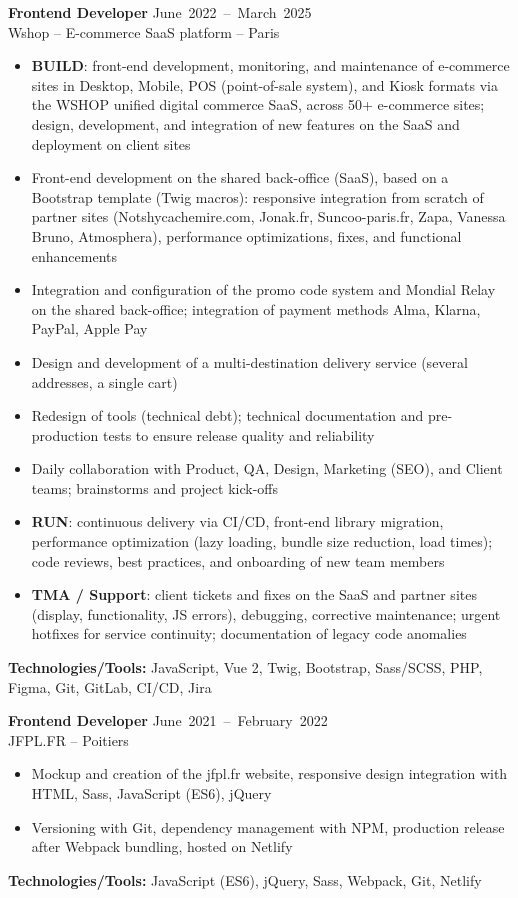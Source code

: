 \documentclass[9pt,a4paper]{extarticle}
\newcommand{\entry}[3]{%
  \vspace{0.25em}%
  {\bfseries #1} \hfill {\color{grey}\footnotesize\mbox{#2}}\\[-1pt]
  {\color{accent}\footnotesize #3}\par\vspace{0.1em}%
}
\begin{document}
{\begin{minipage}[t]{0.488\textwidth}
\entry{Frontend Developer}{June 2022 -- March 2025}{Wshop -- E-commerce SaaS platform -- Paris}
\begin{itemize}
  \item \textbf{BUILD}: front-end development, monitoring, and maintenance of e-commerce sites in Desktop, Mobile, POS (point-of-sale system), and Kiosk formats via the WSHOP unified digital commerce SaaS, across 50+ e-commerce sites; design, development, and integration of new features on the SaaS and deployment on client sites
  \item Front-end development on the shared back-office (SaaS), based on a Bootstrap template (Twig macros): responsive integration from scratch of partner sites (Notshycachemire.com, Jonak.fr, Suncoo-paris.fr, Zapa, Vanessa Bruno, Atmosphera), performance optimizations, fixes, and functional enhancements
  \item Integration and configuration of the promo code system and Mondial Relay on the shared back-office; integration of payment methods Alma, Klarna, PayPal, Apple Pay
  \item Design and development of a multi-destination delivery service (several addresses, a single cart)
  \item Redesign of tools (technical debt); technical documentation and pre-production tests to ensure release quality and reliability
  \item Daily collaboration with Product, QA, Design, Marketing (SEO), and Client teams; brainstorms and project kick-offs
  \item \textbf{RUN}: continuous delivery via CI/CD, front-end library migration, performance optimization (lazy loading, bundle size reduction, load times); code reviews, best practices, and onboarding of new team members
  \item \textbf{TMA / Support}: client tickets and fixes on the SaaS and partner sites (display, functionality, JS errors), debugging, corrective maintenance; urgent hotfixes for service continuity; documentation of legacy code anomalies
\end{itemize}
{\footnotesize\textbf{Technologies/Tools:} JavaScript, Vue 2, Twig, Bootstrap, Sass/SCSS, PHP, Figma, Git, GitLab, CI/CD, Jira}

\entry{Frontend Developer}{June 2021 -- February 2022}{JFPL.FR -- Poitiers}
\begin{itemize}
  \item Mockup and creation of the jfpl.fr website, responsive design integration with HTML, Sass, JavaScript (ES6), jQuery
  \item Versioning with Git, dependency management with NPM, production release after Webpack bundling, hosted on Netlify
\end{itemize}
{\footnotesize\textbf{Technologies/Tools:} JavaScript (ES6), jQuery, Sass, Webpack, Git, Netlify}


\end{minipage}}
\end{document}
